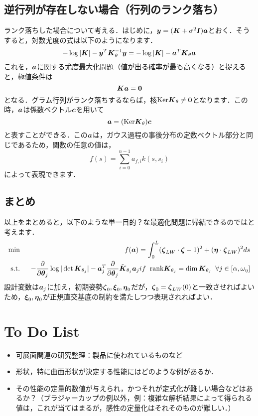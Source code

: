 \documentclass[11pt]{jsarticle}
\begin{document}
		\subsection{逆行列が存在しない場合（行列のランク落ち）}
			ランク落ちした場合について考える．はじめに，$ \boldsymbol{y} = (\boldsymbol{K} + \sigma^2 \boldsymbol{I}) \boldsymbol{a} $とおく．そうすると，対数尤度の式は以下のようになります．
			\begin{equation}\label{key}
				-\log|\boldsymbol{K}| - \boldsymbol{y}^T \boldsymbol{K}_{\theta}^{-1} \boldsymbol{y} = -\log|\boldsymbol{K}| - \boldsymbol{a}^T \boldsymbol{K}_{\theta} \boldsymbol{a} 
			\end{equation}
			これを，$ \boldsymbol{a} $に関する尤度最大化問題（値が出る確率が最も高くなる）と捉えると，極値条件は
			\begin{equation}\label{eq:EX_COND}
				\boldsymbol{K} \boldsymbol{a} = \boldsymbol{0}
			\end{equation}
			となる．グラム行列がランク落ちするならば，核$ {\rm Ker} \boldsymbol{K}_{\theta}  \neq \boldsymbol{0} $となります．この時，$ \boldsymbol{a} $は係数ベクトル$ \boldsymbol{c} $を用いて
			\begin{equation}\label{eq:Aeq}
				\boldsymbol{a} = ({\rm Ker} \boldsymbol{K}_{\theta} ) \boldsymbol{c}
			\end{equation}
			と表すことができる．この$ \boldsymbol{a} $は，ガウス過程の事後分布の定数ベクトル部分と同じであるため，関数の任意の値は，
			\begin{equation}\label{eq:Dist_eq}
				f(s) = \sum_{i=0}^{n-1} a_{f,i} k(s,s_i)
			\end{equation}
			によって表現できます．
		\subsection{まとめ}
		以上をまとめると，以下のような単一目的？な最適化問題に帰結できるのではと考えます．
		\begin{eqnarray}
			\min \;\; &&f(\boldsymbol{a}) = \int_{0}^{L} (\boldsymbol{\zeta}_{LW} \cdot \boldsymbol{\zeta} -1 )^2 + (\boldsymbol{\eta} \cdot \boldsymbol{\zeta}_{LW})^2 ds\\
			\mathrm{s.t.} \;\;&& -\frac{\partial }{\partial \boldsymbol{\theta}_{j}}\log|\det \boldsymbol{K}_{\theta_{j}}| - \boldsymbol{a}_j^T \frac{\partial }{\partial \boldsymbol{\theta}_{j}} \tilde{\boldsymbol{K}}_{\theta_{j}} \boldsymbol{a}_j if \;\; {\rm rank} \boldsymbol{K}_{\theta_{j}} = \dim \boldsymbol{K}_{\theta_{j}} \;\; \forall j \in [\alpha,\omega_{\eta}] 
		\end{eqnarray}
		設計変数は$ \boldsymbol{a}_j$に加え，初期姿勢$ \boldsymbol{\zeta}_0,\boldsymbol{\xi}_0,\boldsymbol{\eta}_0 $だが，$ \boldsymbol{\zeta}_0 = \boldsymbol{\zeta}_{LW}(0) $と一致させればよいため，$ \boldsymbol{\xi}_0,\boldsymbol{\eta}_0 $が正規直交基底の制約を満たしつつ表現されればよい．
	\section{To Do List}
		\begin{itemize}
			\item 可展面関連の研究整理：製品に使われているものなど
			\item 形状，特に曲面形状が決定する性能にはどのような例があるか．
			\item その性能の定量的数値が与えられ，かつそれが定式化が難しい場合などはあるか？（ブラジャーカップの例以外，例：複雑な解析結果によって得られる値は，これが当てはまるが，感性の定量化はそれそのものが難しい．）
			
		\end{itemize}
				
\end{document}
